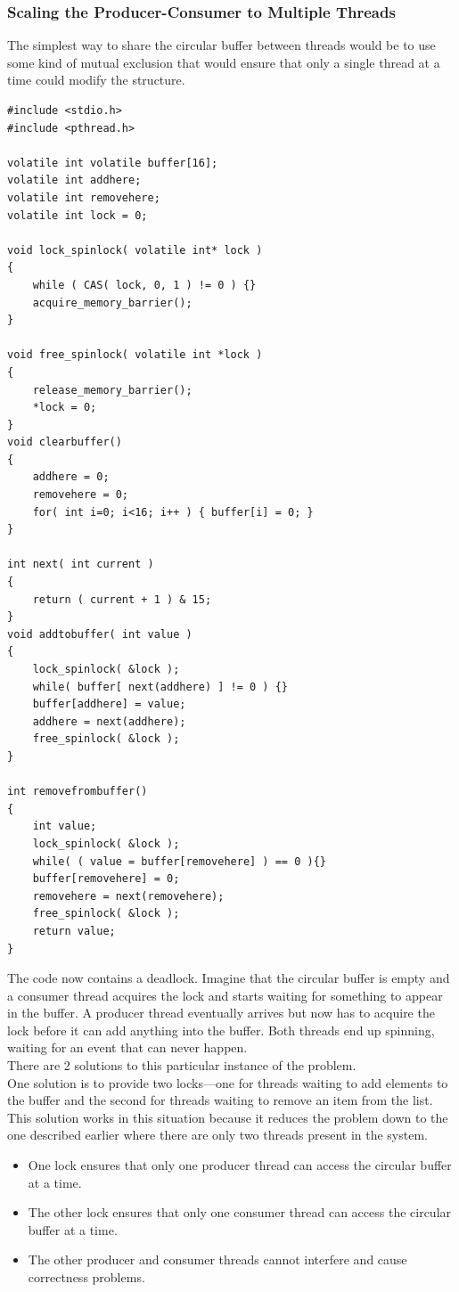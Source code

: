 \documentclass[12pt,a4paper]{report}
\begin{document}
\subsubsection*{Scaling the Producer-Consumer to Multiple Threads}
The simplest way to share the circular buffer between threads would be to use some kind of mutual exclusion that would ensure that only a single thread at a time could modify the structure. 
\begin{lstlisting}
#include <stdio.h>
#include <pthread.h>

volatile int volatile buffer[16];
volatile int addhere;
volatile int removehere;
volatile int lock = 0;

void lock_spinlock( volatile int* lock )
{
	while ( CAS( lock, 0, 1 ) != 0 ) {}
	acquire_memory_barrier();
}

void free_spinlock( volatile int *lock )
{
	release_memory_barrier();
	*lock = 0;
}
void clearbuffer()
{
	addhere = 0;
	removehere = 0;
	for( int i=0; i<16; i++ ) { buffer[i] = 0; }
}

int next( int current )
{
	return ( current + 1 ) & 15;
}
void addtobuffer( int value )
{
	lock_spinlock( &lock );
	while( buffer[ next(addhere) ] != 0 ) {}
	buffer[addhere] = value;
	addhere = next(addhere);
	free_spinlock( &lock );
}

int removefrombuffer()
{
	int value;
	lock_spinlock( &lock );
	while( ( value = buffer[removehere] ) == 0 ){}
	buffer[removehere] = 0;
	removehere = next(removehere);
	free_spinlock( &lock );
	return value;
}
\end{lstlisting}
The code now contains a deadlock. Imagine that the circular buffer is empty and a consumer thread acquires the lock and starts waiting for something to appear in the buffer. A producer thread eventually arrives but now has to acquire the lock before it can add anything into the buffer. Both threads end up spinning, waiting for an event that can never happen.
\\
There are 2 solutions to this particular instance of the problem.
\\
One solution is to provide two locks---one for threads waiting to add elements to the buffer and the second for threads waiting to remove an item from the list. This solution works in this situation because it reduces the problem down to the one described earlier where there are only two threads present in the system.
\begin{itemize}
	\item 	One lock ensures that only one producer thread can access the circular buffer at a time. 
	\item The other lock ensures that only one consumer thread can access the circular buffer at a time.
	\item The other producer and consumer threads cannot interfere and cause correctness problems.
\end{itemize}
\end{document}
